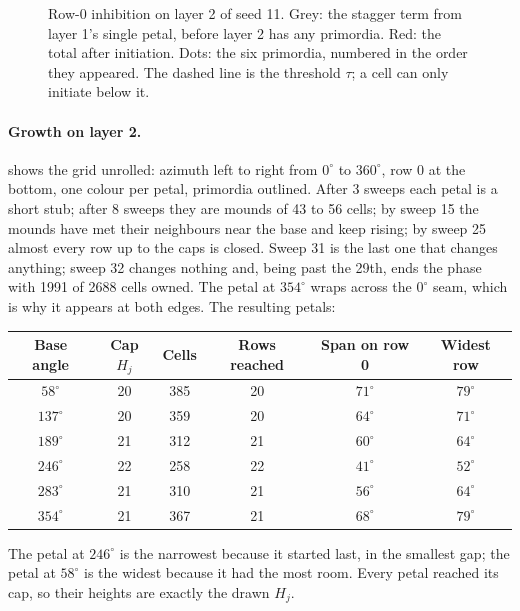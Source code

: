 \begin{figure}[ht]
\centering

\caption{Row-0 inhibition on layer 2 of seed 11. Grey: the stagger term from
layer 1's single petal, before layer 2 has any primordia. Red: the total after
initiation. Dots: the six primordia, numbered in the order they appeared. The
dashed line is the threshold $\tau$; a cell can only initiate below it.}
\label{fig:ca-inhibition}
\end{figure}

\paragraph{Growth on layer 2.}  shows the grid unrolled:
azimuth left to right from $0^\circ$ to $360^\circ$, row 0 at the bottom, one
colour per petal, primordia outlined. After 3 sweeps each petal is a short
stub; after 8 sweeps they are mounds of 43 to 56 cells; by sweep 15 the mounds
have met their neighbours near the base and keep rising; by sweep 25 almost
every row up to the caps is closed. Sweep 31 is the last one that changes
anything; sweep 32 changes nothing and, being past the 29th, ends the phase
with 1991 of 2688 cells owned. The petal at $354^\circ$ wraps across the $0^\circ$ seam,
which is why it appears at both edges. The resulting petals:
\begin{center}\small
\begin{tabular}{@{}cccccc@{}}
\toprule
Base angle & Cap $H_j$ & Cells & Rows reached & Span on row 0 & Widest row \\
\midrule
$58^\circ$ & 20 & 385 & 20 & $71^\circ$ & $79^\circ$ \\
$137^\circ$ & 20 & 359 & 20 & $64^\circ$ & $71^\circ$ \\
$189^\circ$ & 21 & 312 & 21 & $60^\circ$ & $64^\circ$ \\
$246^\circ$ & 22 & 258 & 22 & $41^\circ$ & $52^\circ$ \\
$283^\circ$ & 21 & 310 & 21 & $56^\circ$ & $64^\circ$ \\
$354^\circ$ & 21 & 367 & 21 & $68^\circ$ & $79^\circ$ \\
\bottomrule
\end{tabular}
\end{center}
The petal at $246^\circ$ is the narrowest because it started last, in the
smallest gap; the petal at $58^\circ$ is the widest because it had the most
room. Every petal reached its cap, so their heights are exactly the drawn
$H_j$.

